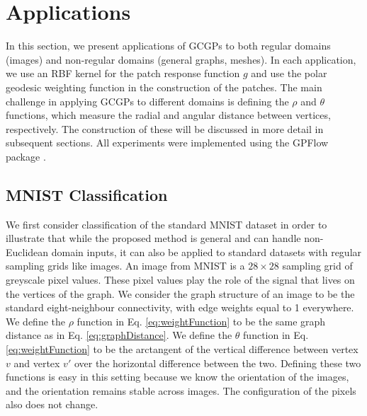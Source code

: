 \documentclass{article}
\begin{document}
\section{Applications}

In this section, we present applications of GCGPs to both regular domains (images) and non-regular domains (general graphs, meshes). In each application, we use an RBF kernel for the patch response function $g$ and use the polar geodesic weighting function in the construction of the patches. The main challenge in applying GCGPs to different domains is defining the $\rho$ and $\theta$ functions, which measure the radial and angular distance between vertices, respectively. The construction of these will be discussed in more detail in subsequent sections. All experiments were implemented using the GPFlow package \citep{GPflow2017}.

\subsection{MNIST Classification}\label{sec:mnist}

We first consider classification of the standard MNIST dataset in order to illustrate that while the proposed method is general and can handle non-Euclidean domain inputs, it can also be applied to standard datasets with regular sampling grids like images. An image from MNIST is a $28 \times 28$ sampling grid of greyscale pixel values. These pixel values play the role of the signal that lives on the vertices of the graph. We consider the graph structure of an image to be the standard eight-neighbour connectivity, with edge weights equal to 1 everywhere. We define the $\rho$ function in Eq. \eqref{eq:weightFunction} to be the same graph distance as in Eq. \eqref{eq:graphDistance}. We define the $\theta$ function in Eq. \eqref{eq:weightFunction} to be the arctangent of the vertical difference between vertex $v$ and vertex $v'$ over the horizontal difference between the two. Defining these two functions is easy in this setting because we know the orientation of the images, and the orientation remains stable across images. The configuration of the pixels also does not change.
\end{document}
